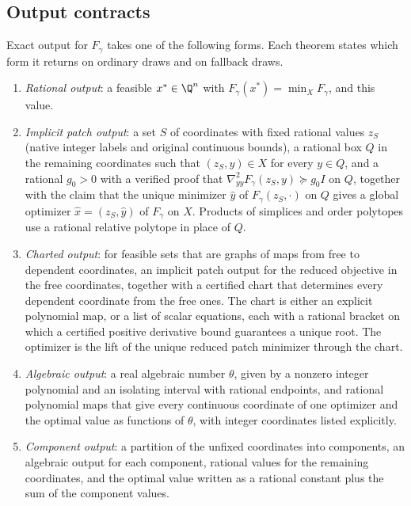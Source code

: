 \subsection{Output contracts}\label{sec:model:outputs}

Exact output for $F_\gamma$ takes one of the following forms. Each theorem
states which form it returns on ordinary draws and on fallback draws.

\begin{definition}\label{def:model:outputs}
\leavevmode
\begin{enumerate}[label=(\alph*)]
\item\label{it:model:rational} \emph{Rational output}: a feasible
$x^*\in\Q^n$ with $F_\gamma(x^*)=\min_XF_\gamma$, and this value.
\item\label{it:model:implicit} \emph{Implicit patch output}: a set $S$ of
coordinates with fixed rational values $z_S$ (native integer labels and
original continuous bounds), a rational box $Q$ in the remaining
coordinates such that $(z_S,y)\in X$ for every $y\in Q$, and a rational
$g_0>0$ with a verified proof that
$\nabla^2_{yy}F_\gamma(z_S,y)\succeq g_0I$ on $Q$, together with the claim
that the unique minimizer $\hat y$ of $F_\gamma(z_S,\cdot)$ on $Q$ gives a
global optimizer $\hat x=(z_S,\hat y)$ of $F_\gamma$ on $X$. Products of
simplices and order polytopes use a rational relative polytope in place of
$Q$.
\item\label{it:model:charted} \emph{Charted output}: for feasible sets that
are graphs of maps from free to dependent coordinates, an implicit patch
output for the reduced objective in the free coordinates, together with a
certified chart that determines every dependent coordinate from the free
ones. The chart is either an explicit polynomial map, or a list of scalar
equations, each with a rational bracket on which a certified positive
derivative bound guarantees a unique root. The optimizer is the lift of the
unique reduced patch minimizer through the chart.
\item\label{it:model:algebraic} \emph{Algebraic output}: a real algebraic
number $\theta$, given by a nonzero integer polynomial and an isolating
interval with rational endpoints, and rational polynomial maps that give
every continuous coordinate of one optimizer and the optimal value as
functions of $\theta$, with integer coordinates listed explicitly.
\item\label{it:model:component} \emph{Component output}: a partition of the
unfixed coordinates into components, an algebraic output for each
component, rational values for the remaining coordinates, and the optimal
value written as a rational constant plus the sum of the component values.
\end{enumerate}
\end{definition}


